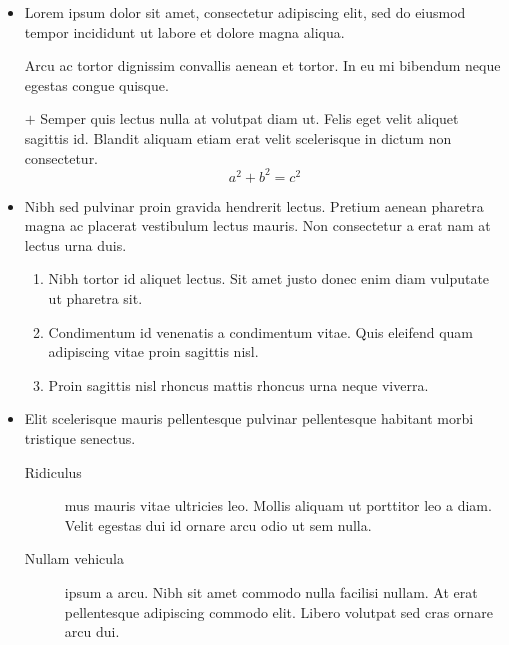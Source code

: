 \documentclass[a4paper, 12pt]{report}
\begin{document}
    \begin{itemize}
        \item Lorem ipsum dolor sit amet, consectetur adipiscing elit, sed do eiusmod tempor incididunt ut labore et dolore magna aliqua.

        Arcu ac tortor dignissim convallis aenean et tortor. In eu mi bibendum neque egestas congue quisque.

        \item[$+$] Semper quis lectus nulla at volutpat diam ut. Felis eget velit aliquet sagittis id. Blandit aliquam etiam erat velit scelerisque in dictum non consectetur.
        \begin{equation}\label{equation:exemple}
            a^2 + b^2 = c^2
        \end{equation}

        \item Nibh sed pulvinar proin gravida hendrerit lectus. Pretium aenean pharetra magna ac placerat vestibulum lectus mauris. Non consectetur a erat nam at lectus urna duis.
        \begin{enumerate}[noitemsep, label=\roman*.]
            \item Nibh tortor id aliquet lectus. Sit amet justo donec enim diam vulputate ut pharetra sit.
            \setcounter{enumi}{3}
            \item Condimentum id venenatis a condimentum vitae. Quis eleifend quam adipiscing vitae proin sagittis nisl.
            \addtocounter{enumi}{15}
            \item Proin sagittis nisl rhoncus mattis rhoncus urna neque viverra.
        \end{enumerate}

        \item Elit scelerisque mauris pellentesque pulvinar pellentesque habitant morbi tristique senectus.
            \begin{description}
                \item[Ridiculus] mus mauris vitae ultricies leo. Mollis aliquam ut porttitor leo a diam. Velit egestas dui id ornare arcu odio ut sem nulla.
                \item[Nullam vehicula] ipsum a arcu. Nibh sit amet commodo nulla facilisi nullam. At erat pellentesque adipiscing commodo elit. Libero volutpat sed cras ornare arcu dui.
            \end{description}
    \end{itemize}
\end{document}
